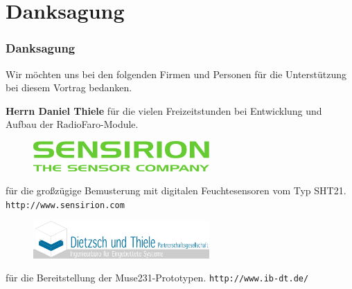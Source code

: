 \documentclass{beamer}
\begin{document}
\section{Danksagung}
\begin{frame}
\frametitle{Danksagung}

Wir möchten uns bei den folgenden Firmen und Personen
für die Unterstützung bei diesem Vortrag bedanken.

\vspace{0.3 cm}

\textbf{Herrn Daniel Thiele}
für die vielen Freizeitstunden bei Entwicklung und
Aufbau der RadioFaro-Module.

\vspace{0.3 cm}

\begin{figure}
\includegraphics[width=0.6\textwidth]{../sensirion_logo.jpg}
\end{figure}
für die großzügige Bemusterung mit digitalen Feuchtesensoren
vom Typ SHT21.
\texttt{http://www.sensirion.com}

\vspace{0.3 cm}

\begin{figure}
\includegraphics[width=0.6\textwidth]{../ibdt_logo.png}
\end{figure}
für die Bereitstellung der Muse231-Prototypen.
\texttt{http://www.ib-dt.de/}

\end{frame}
\end{document}
